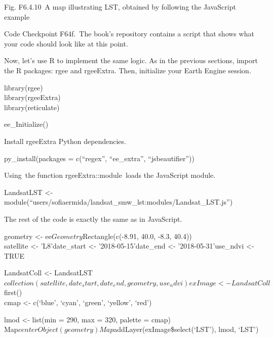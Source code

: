 \documentclass[
  letterpaper,
  DIV=11,
  numbers=noendperiod]{scrreprt}
\begin{document}
Fig. F6.4.10~A map illustrating LST, obtained by following the
JavaScript example

\begin{tcolorbox}[enhanced jigsaw, left=2mm, breakable, rightrule=.15mm, opacityback=0, colframe=quarto-callout-note-color-frame, colbacktitle=quarto-callout-note-color!10!white, arc=.35mm, opacitybacktitle=0.6, toptitle=1mm, colback=white, leftrule=.75mm, title=\textcolor{quarto-callout-note-color}{\faInfo}\hspace{0.5em}{Note}, toprule=.15mm, bottomtitle=1mm, titlerule=0mm, bottomrule=.15mm, coltitle=black]

Code Checkpoint F64f.~The book's repository contains a script that shows
what your code should look like at this point.

\end{tcolorbox}

Now, let's use R to implement the same logic. As in the previous
sections, import the R packages: rgee and rgeeExtra. Then, initialize
your Earth Engine session.

library(rgee)\\
library(rgeeExtra)\\
library(reticulate)

ee\_Initialize()

Install rgeeExtra Python dependencies.

py\_install(packages = c(``regex'', ``ee\_extra'', ``jsbeautifier''))

Using~the function rgeeExtra::module~loads the JavaScript module.

LandsatLST \textless-
module(``users/sofiaermida/landsat\_smw\_lst:modules/Landsat\_LST.js'')

The rest of the code is exactly the same as in JavaScript.

geometry \textless- ee\(Geometry\)Rectangle(c(-8.91, 40.0, -8.3,
40.4))\\
satellite \textless- 'L8'date\_start \textless- '2018-05-15'date\_end
\textless- '2018-05-31'use\_ndvi \textless- TRUE

LandsatColl \textless-
LandsatLST\(collection(satellite, date_start, date_end, geometry, use_ndvi) exImage <- LandsatColl\)first()\\
cmap \textless- c(`blue', `cyan', `green', `yellow', `red')

lmod \textless- list(min = 290, max = 320, palette = cmap)\\
Map\(centerObject(geometry) Map\)addLayer(exImage\$select(`LST'), lmod,
`LST')
\end{document}
